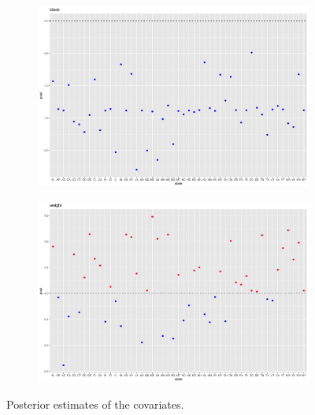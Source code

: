 \documentclass[11pt]{article}
\begin{document}
\begin{figure}

    \centering
    \begin{subfigure}[t]{0.9\textwidth}
        \centering
        \includegraphics[width=\linewidth]{Ex5/figures/2post covariates9.png} 
    \end{subfigure}
    \hfill
    \begin{subfigure}[t]{0.9\textwidth}
        \centering
        \includegraphics[width=\linewidth]{Ex5/figures/2post covariates10.png} 
    \end{subfigure}
    \caption{Posterior estimates of the covariates.}
\end{figure}
\end{document}
